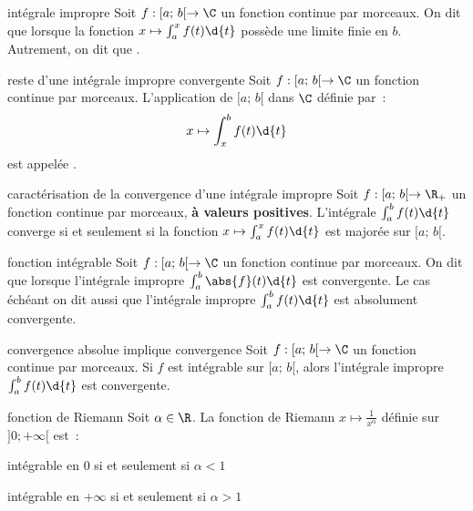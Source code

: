 

\begin{adjustwidth}{-3cm}{-3cm}


\newcommand{\intsemi}[0]{[a;\,b[}


\begin{definition}{12.1}{intégrale impropre}
    Soit $f:\intsemi \to \C$ un fonction continue par morceaux. On dit que  lorsque la fonction $x \mapsto \int_a^x f(t) \d{t}$ possède une limite finie en $b$.\\
    Autrement, on dit que .
\end{definition}

\begin{definition}{12.5}{reste d'une intégrale impropre convergente}
    Soit $f:\intsemi \to \C$ un fonction continue par morceaux. L'application de $\intsemi$ dans $\C$ définie par~:
    $$x \mapsto \int_x^b f(t) \d{t}$$
    est appelée .
\end{definition}

\begin{proposition}{12.8}{caractérisation de la convergence d'une intégrale impropre}
    Soit $f:\intsemi \to \R_+$ un fonction continue par morceaux, \textbf{à valeurs positives}. L'intégrale $\int_a^bf(t)\d{t}$ converge si et seulement si la fonction $x \mapsto \int_a^x f(t)\d{t}$ est majorée sur $\intsemi$.
\end{proposition}

\begin{definition}{12.14}{fonction intégrable}
    Soit $f:\intsemi \to \C$ un fonction continue par morceaux. On dit que  lorsque l'intégrale impropre $\int_a^b \abs{f}(t)\d{t}$ est convergente. Le cas échéant on dit aussi que l'intégrale impropre $\int_a^b f(t) \d{t}$ est absolument convergente.
\end{definition}

\begin{theoreme}{12.16}{convergence absolue implique convergence}
    Soit $f:\intsemi \to \C$ un fonction continue par morceaux. Si $f$ est intégrable sur $\intsemi$, alors l'intégrale impropre $\int_a^b f(t)\d{t}$ est convergente.
\end{theoreme}

\begin{theoreme}{12.19}{fonction de Riemann}
    Soit $\alpha \in \R$. La fonction de Riemann $\displaystyle x \mapsto \frac{1}{x^\alpha}$ définie sur $]0 ; +\infty[$ est~:
    \begin{enumeratebf}
        \item intégrable en $0$ si et seulement si $\alpha < 1$
        \item intégrable en $+ \infty$ si et seulement si $\alpha > 1$
    \end{enumeratebf}
\end{theoreme}


\end{adjustwidth}
